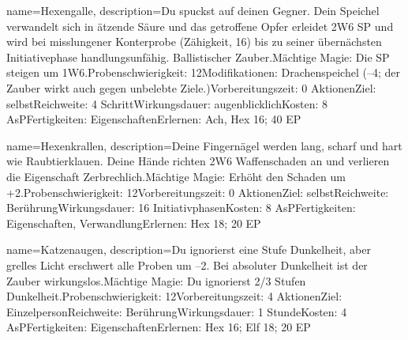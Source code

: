 {
    name={Hexengalle},
    description={Du spuckst auf deinen Gegner. Dein Speichel verwandelt sich in ätzende Säure und das getroffene Opfer erleidet 2W6 SP und wird bei misslungener Konterprobe (Zähigkeit, 16) bis zu seiner übernächsten Initiativephase handlungsunfähig. Ballistischer Zauber.\newline Mächtige Magie: Die SP steigen um 1W6.\newline Probenschwierigkeit: 12\newline Modifikationen: Drachenspeichel (–4; der Zauber wirkt auch gegen unbelebte Ziele.)\newline Vorbereitungszeit: 0 Aktionen\newline Ziel: selbst\newline Reichweite: 4 Schritt\newline Wirkungsdauer: augenblicklich\newline Kosten: 8 AsP\newline Fertigkeiten: Eigenschaften\newline Erlernen: Ach, Hex 16; 40 EP}
}


{
    name={Hexenkrallen},
    description={Deine Fingernägel werden lang, scharf und hart wie Raubtierklauen. Deine Hände richten 2W6 Waffenschaden an und verlieren die Eigenschaft Zerbrechlich.\newline Mächtige Magie: Erhöht den Schaden um +2.\newline Probenschwierigkeit: 12\newline Vorbereitungszeit: 0 Aktionen\newline Ziel: selbst\newline Reichweite: Berührung\newline Wirkungsdauer: 16 Initiativphasen\newline Kosten: 8 AsP\newline Fertigkeiten: Eigenschaften, Verwandlung\newline Erlernen: Hex 18; 20 EP}
}


{
    name={Katzenaugen},
    description={Du ignorierst eine Stufe Dunkelheit, aber grelles Licht erschwert alle Proben um –2. Bei absoluter Dunkelheit ist der Zauber wirkungslos.\newline Mächtige Magie: Du ignorierst 2/3 Stufen Dunkelheit.\newline Probenschwierigkeit: 12\newline Vorbereitungszeit: 4 Aktionen\newline Ziel: Einzelperson\newline Reichweite: Berührung\newline Wirkungsdauer: 1 Stunde\newline Kosten: 4 AsP\newline Fertigkeiten: Eigenschaften\newline Erlernen: Hex 16; Elf 18; 20 EP}
}


